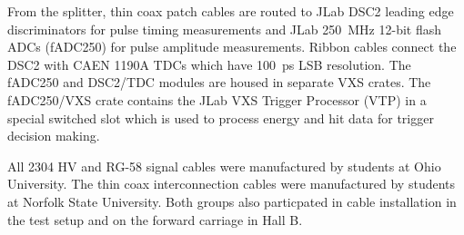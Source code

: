 From the splitter, thin coax patch cables are routed to JLab DSC2 leading edge discriminators for pulse timing measurements and JLab 250~MHz 12-bit flash ADCs (fADC250) for pulse amplitude measurements.  Ribbon cables connect the DSC2 with CAEN 1190A TDCs which have 100~ps LSB resolution. The fADC250 and DSC2/TDC modules are housed in separate VXS crates.  The fADC250/VXS crate contains the JLab VXS Trigger Processor (VTP) in a special switched slot which is used to process energy and hit data for trigger decision making.

All 2304 HV and RG-58 signal cables were manufactured by students at Ohio University.  The thin coax interconnection cables were  manufactured by students at Norfolk State University.  Both groups also particpated in cable installation in the test setup and on the forward carriage in Hall B.  





